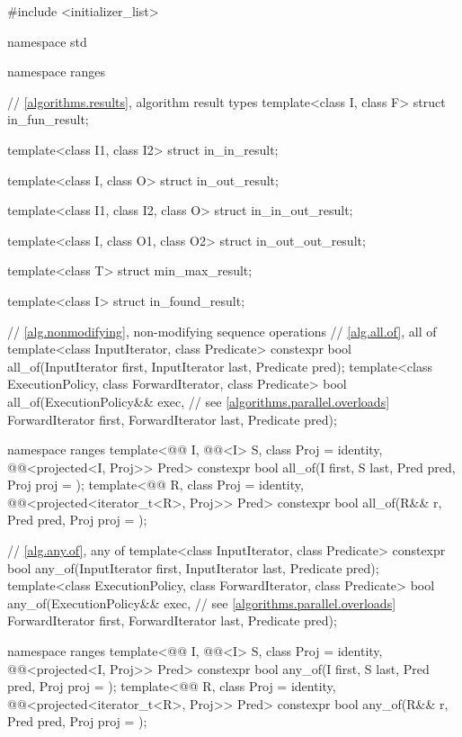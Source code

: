 \begin{codeblock}
#include <initializer_list>

namespace std {
  namespace ranges {
    // \ref{algorithms.results}, algorithm result types
    template<class I, class F>
      struct in_fun_result;

    template<class I1, class I2>
      struct in_in_result;

    template<class I, class O>
      struct in_out_result;

    template<class I1, class I2, class O>
      struct in_in_out_result;

    template<class I, class O1, class O2>
      struct in_out_out_result;

    template<class T>
      struct min_max_result;

    template<class I>
      struct in_found_result;
  }

  // \ref{alg.nonmodifying}, non-modifying sequence operations
  // \ref{alg.all.of}, all of
  template<class InputIterator, class Predicate>
    constexpr bool all_of(InputIterator first, InputIterator last, Predicate pred);
  template<class ExecutionPolicy, class ForwardIterator, class Predicate>
    bool all_of(ExecutionPolicy&& exec,                         // see \ref{algorithms.parallel.overloads}
                ForwardIterator first, ForwardIterator last, Predicate pred);

  namespace ranges {
    template<@@ I, @@<I> S, class Proj = identity,
             @@<projected<I, Proj>> Pred>
      constexpr bool all_of(I first, S last, Pred pred, Proj proj = {});
    template<@@ R, class Proj = identity,
             @@<projected<iterator_t<R>, Proj>> Pred>
      constexpr bool all_of(R&& r, Pred pred, Proj proj = {});
  }

  // \ref{alg.any.of}, any of
  template<class InputIterator, class Predicate>
    constexpr bool any_of(InputIterator first, InputIterator last, Predicate pred);
  template<class ExecutionPolicy, class ForwardIterator, class Predicate>
    bool any_of(ExecutionPolicy&& exec,                         // see \ref{algorithms.parallel.overloads}
                ForwardIterator first, ForwardIterator last, Predicate pred);

  namespace ranges {
    template<@@ I, @@<I> S, class Proj = identity,
             @@<projected<I, Proj>> Pred>
      constexpr bool any_of(I first, S last, Pred pred, Proj proj = {});
    template<@@ R, class Proj = identity,
             @@<projected<iterator_t<R>, Proj>> Pred>
      constexpr bool any_of(R&& r, Pred pred, Proj proj = {});
  }

}
\end{codeblock}
